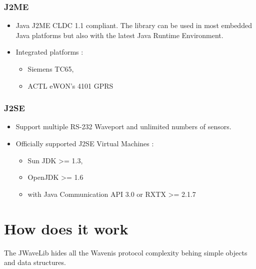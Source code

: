 \documentclass[a4paper,10pt,english]{sphinxmanual}
\begin{document}
\subsubsection{J2ME}
\label{introduction:j2me}\begin{itemize}
\item {} 
Java J2ME CLDC 1.1 compliant. The library can be used in most embedded  Java platforms but also with the latest Java Runtime Environment.

\item {} 
Integrated platforms :
\begin{itemize}
\item {} 
Siemens TC65,

\item {} 
ACTL eWON’s 4101 GPRS

\end{itemize}

\end{itemize}


\subsubsection{J2SE}
\label{introduction:j2se}\begin{itemize}
\item {} 
Support multiple RS-232 Waveport and unlimited numbers of sensors.

\item {} 
Officially supported J2SE Virtual Machines :
\begin{itemize}
\item {} 
Sun JDK \textgreater{}= 1.3,

\item {} 
OpenJDK \textgreater{}= 1.6

\item {} 
with Java Communication API 3.0 or RXTX \textgreater{}= 2.1.7

\end{itemize}

\end{itemize}


\section{How does it work}
\label{introduction:how-does-it-work}
The JWaveLib hides all the Wavenis protocol complexity behing simple objects
and data structures.
\end{document}
